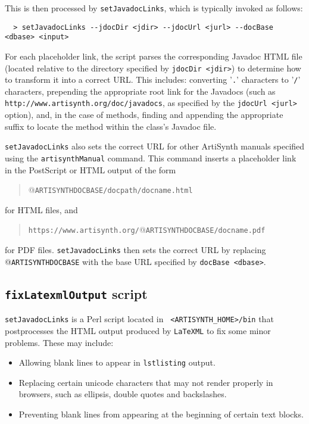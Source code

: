 \documentclass{article}
\begin{document}
This is then processed by {\tt setJavadocLinks}, which is typically
invoked as follows:
%
\begin{verbatim}
  > setJavadocLinks --jdocDir <jdir> --jdocUrl <jurl> --docBase <dbase> <input>       
\end{verbatim}
%
For each placeholder link, the script parses the corresponding Javadoc
HTML file (located relative to the directory specified by 
{\tt \DHY jdocDir <jdir>}) to determine how to transform it into a correct
URL. This includes: converting '{\tt .}' characters to '{\tt /}'
characters, prepending the appropriate root link for the Javadocs
(such as \\ 
{\tt http://www.\-artisynth.org/doc/javadocs}, as specified
by the {\tt \DHY jdocUrl <jurl>} option), and, in the case of methods, finding and
appending the appropriate suffix to locate the method within the
class's Javadoc file.

{\tt setJavadocLinks} also sets the correct URL for other ArtiSynth
manuals specified using the {\tt \BKS artisynthManual} command.  This
command inserts a placeholder link in the PostScript or HTML output of the form

\begin{quote}
@{\tt ARTISYNTHDOCBASE/docpath/docname.html}
\end{quote}

for HTML files, and 

\begin{quote}
{\tt https://www.artisynth.org/}@{\tt ARTISYNTHDOCBASE/docname.pdf}
\end{quote}

for PDF files. {\tt setJavadocLinks} then sets the correct URL by replacing
@{\tt ARTISYNTHDOCBASE} with the base URL specified by
{\tt \DHY docBase <dbase>}.

\subsection{{\tt fixLatexmlOutput} script}
\label{fixLatexmlOutputSec}

{\tt setJavadocLinks} is a Perl script located in {\tt
<ARTISYNTH\_HOME>/bin} that postprocesses the HTML output produced 
by {\tt LaTeXML} to fix some minor problems. These may include:

\begin{itemize}

\item Allowing blank lines to appear in {\tt lstlisting} output.

\item Replacing certain unicode characters that may not render
properly in browsers, such as ellipsis, double quotes and backslashes.

\item Preventing blank lines from appearing at the beginning
of certain text blocks.

\end{itemize}
\end{document}
